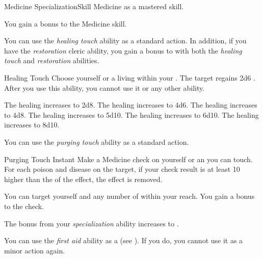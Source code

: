     \begin{feat}{Medicine Specialization}{Skill}
        \featpre Medicine as a mastered skill.

         You gain a  bonus to the Medicine skill.

         You can use the \textit{healing touch} ability as a standard action.
        In addition, if you have the \textit{restoration} cleric ability, you gain a  bonus to  with both the \textit{healing touch} and \textit{restoration} abilities.
        \begin{instantability}{Healing Touch}
            \rankline
            Choose yourself or a living  within your .
            The target regains 2d6 \add {} .
            After you use this ability, you  cannot use it or any other  ability.

            \rankline
             The healing increases to 2d8.
             The healing increases to 4d6.
             The healing increases to 4d8.
             The healing increases to 5d10.
             The healing increases to 6d10.
             The healing increases to 8d10.
        \end{instantability}

         You can use the \textit{purging touch} ability as a standard action.
        \begin{instantability}{Purging Touch}
            Instant
            \rankline
            Make a Medicine check on yourself or an  you can touch.
            For each poison and disease on the target, if your check result is at least 10 higher than the  of the effect, the effect is removed.

            \rankline
             You can target yourself and any number of  within your reach.
             You gain a  bonus to the check.
        \end{instantability}

         The bonus from your \textit{specialization} ability increases to .

         You can use the \textit{first aid} ability as a  (see ).
        If you do, you  cannot use it as a minor action again.


\end{feat}
